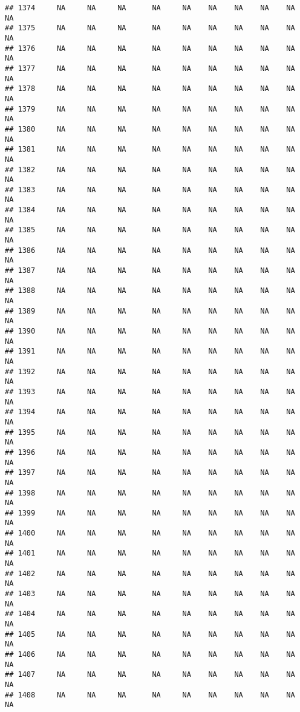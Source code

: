 \documentclass{article}\usepackage{graphicx, color}
\makeatletter
\newenvironment{kframe}{%
 \def\at@end@of@kframe{}%
 \ifinner\ifhmode%
  \def\at@end@of@kframe{\end{minipage}}%
  \begin{minipage}{\columnwidth}%
 \fi\fi%
 \def\FrameCommand##1{\hskip\@totalleftmargin \hskip-\fboxsep
 \colorbox{shadecolor}{##1}\hskip-\fboxsep
     \hskip-\linewidth \hskip-\@totalleftmargin \hskip\columnwidth}%
 \MakeFramed {\advance\hsize-\width
   \@totalleftmargin\z@ \linewidth\hsize
   \@setminipage}}%
 {\par\unskip\endMakeFramed%
 \at@end@of@kframe}
\newenvironment{knitrout}{}{} %
\makeatother
\begin{document}
\begin{knitrout}
\begin{kframe}
\begin{verbatim}
## 1374     NA     NA     NA      NA     NA    NA    NA    NA    NA     NA
## 1375     NA     NA     NA      NA     NA    NA    NA    NA    NA     NA
## 1376     NA     NA     NA      NA     NA    NA    NA    NA    NA     NA
## 1377     NA     NA     NA      NA     NA    NA    NA    NA    NA     NA
## 1378     NA     NA     NA      NA     NA    NA    NA    NA    NA     NA
## 1379     NA     NA     NA      NA     NA    NA    NA    NA    NA     NA
## 1380     NA     NA     NA      NA     NA    NA    NA    NA    NA     NA
## 1381     NA     NA     NA      NA     NA    NA    NA    NA    NA     NA
## 1382     NA     NA     NA      NA     NA    NA    NA    NA    NA     NA
## 1383     NA     NA     NA      NA     NA    NA    NA    NA    NA     NA
## 1384     NA     NA     NA      NA     NA    NA    NA    NA    NA     NA
## 1385     NA     NA     NA      NA     NA    NA    NA    NA    NA     NA
## 1386     NA     NA     NA      NA     NA    NA    NA    NA    NA     NA
## 1387     NA     NA     NA      NA     NA    NA    NA    NA    NA     NA
## 1388     NA     NA     NA      NA     NA    NA    NA    NA    NA     NA
## 1389     NA     NA     NA      NA     NA    NA    NA    NA    NA     NA
## 1390     NA     NA     NA      NA     NA    NA    NA    NA    NA     NA
## 1391     NA     NA     NA      NA     NA    NA    NA    NA    NA     NA
## 1392     NA     NA     NA      NA     NA    NA    NA    NA    NA     NA
## 1393     NA     NA     NA      NA     NA    NA    NA    NA    NA     NA
## 1394     NA     NA     NA      NA     NA    NA    NA    NA    NA     NA
## 1395     NA     NA     NA      NA     NA    NA    NA    NA    NA     NA
## 1396     NA     NA     NA      NA     NA    NA    NA    NA    NA     NA
## 1397     NA     NA     NA      NA     NA    NA    NA    NA    NA     NA
## 1398     NA     NA     NA      NA     NA    NA    NA    NA    NA     NA
## 1399     NA     NA     NA      NA     NA    NA    NA    NA    NA     NA
## 1400     NA     NA     NA      NA     NA    NA    NA    NA    NA     NA
## 1401     NA     NA     NA      NA     NA    NA    NA    NA    NA     NA
## 1402     NA     NA     NA      NA     NA    NA    NA    NA    NA     NA
## 1403     NA     NA     NA      NA     NA    NA    NA    NA    NA     NA
## 1404     NA     NA     NA      NA     NA    NA    NA    NA    NA     NA
## 1405     NA     NA     NA      NA     NA    NA    NA    NA    NA     NA
## 1406     NA     NA     NA      NA     NA    NA    NA    NA    NA     NA
## 1407     NA     NA     NA      NA     NA    NA    NA    NA    NA     NA
## 1408     NA     NA     NA      NA     NA    NA    NA    NA    NA     NA

\end{verbatim}
\end{kframe}
\end{knitrout}
\end{document}
